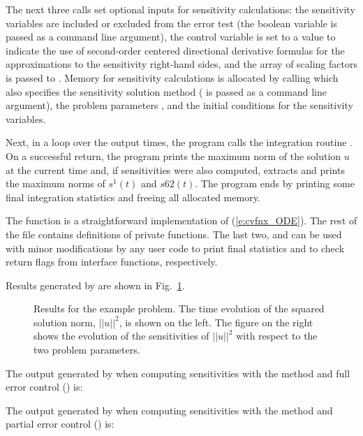 The next three calls set optional inputs for sensitivity calculations: the sensitivity
variables are included or excluded from the error test (the boolean variable 
is passed as a command line argument), the control variable  is set to a value
 to indicate  the use of second-order centered directional derivative formulas
for the approximations to the sensitivity right-hand sides, and the array of
scaling factors  is passed to {\cvodes}.
Memory for sensitivity calculations is allocated by calling 
which also specifies the sensitivity solution method ( is passed
as a command line argument), the problem parameters , and the initial conditions
for the sensitivity variables.

Next, in a loop over the  output times, the program calls the integration
routine . On a successful return, the program prints the maximum norm
of the solution $u$ at the current time and, if sensitivities were also computed, 
extracts and prints the maximum norms of $s^1(t)$ and $s62(t)$.
The program ends by printing some final integration statistics and freeing all
allocated memory.

The  function is a straightforward implementation of (\ref{e:cvfnx_ODE}).
The rest of the file  contains definitions of private functions. 
The last two,  and  can be used with minor
modifications by any {\cvodes} user code to print final {\cvodes} statistics
and to check return flags from {\cvodes} interface functions, respectively.

Results generated by  are shown in Fig.~\ref{f:cvfnx}. 
\begin{figure}
  {\centerline{}}
  \caption{Results for the  example problem.
    The time evolution of the squared solution norm, $||u||^2$, is shown on the left. 
    The figure on the right shows the evolution of the sensitivities of $||u||^2$
    with respect to the two problem parameters.}
  \label{f:cvfnx}
\end{figure}
The output generated by  when computing sensitivities with the 
method and full error control () is:


The output generated by  when computing sensitivities with the 
method and partial error control () is:

